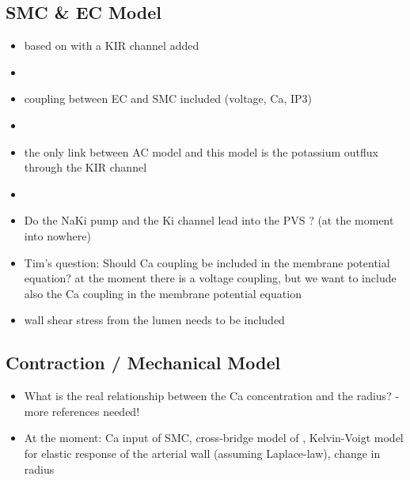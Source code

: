 \subsection{SMC \& EC Model}



\begin{itemize}
\item based on \cite{Koenigsberger2006} with a KIR channel added
\item {}
\item coupling between EC and SMC included (voltage, Ca, IP3)
\item {}
\item the only link between AC model and this model is the potassium outflux through the KIR channel  
\item {}
\item Do the NaKi pump and the Ki channel lead into the PVS ? (at the moment into nowhere)
\item Tim's question: Should Ca coupling be included in the membrane potential equation? at the moment there is a voltage coupling, but we want to include also the Ca coupling in the membrane potential equation
\item wall shear stress from the lumen needs to be included
\end{itemize}


\subsection{Contraction / Mechanical Model}



\begin{itemize}
\item What is the real relationship between the Ca concentration and the radius? - more references needed!
\item At the moment: Ca input of SMC, cross-bridge model of \citet{HaiMurphy}, Kelvin-Voigt model for elastic response of the arterial wall (assuming Laplace-law), change in radius 
\end{itemize}

